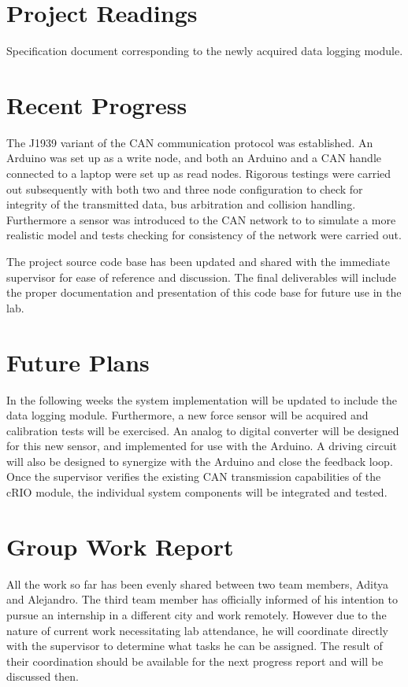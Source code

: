 \documentclass[12pt]{article}
\begin{document}
\section*{Project Readings}
Specification document corresponding to the newly acquired data logging module.

\section*{Recent Progress}
The J1939 variant of the CAN communication protocol was established. An Arduino
was set up as a write node, and both an Arduino and a CAN handle connected to a
laptop were set up as read nodes. Rigorous testings were carried out 
subsequently with both two and three node configuration to check for integrity 
of the transmitted data, bus arbitration and collision handling. Furthermore a
sensor was introduced to the CAN network to to simulate a more realistic model
and tests checking for consistency of the network were carried out.\newline

The project source code base has been updated and shared with the immediate 
supervisor for ease of reference and discussion. The final deliverables will
include the proper documentation and presentation of this code base for future
use in the lab.

\section*{Future Plans}
In the following weeks the system implementation will be updated to include 
the data logging module. Furthermore, a new force sensor will be acquired and 
calibration tests will be exercised. An analog to digital converter will be 
designed for this new sensor, and implemented for use with the Arduino.
A driving circuit will also be designed to synergize with the Arduino and close
the feedback loop. Once the supervisor verifies the existing CAN transmission 
capabilities of the cRIO module, the individual system components will be 
integrated and tested.

\section*{Group Work Report}
All the work so far has been evenly shared between two team members, Aditya and
Alejandro. The third team member has officially informed of his intention to 
pursue an internship in a different city and work remotely. However due to the 
nature of current work necessitating lab attendance, he will coordinate directly
with the supervisor to determine what tasks he can be assigned. The result of
their coordination should be available for the next progress report and will
be discussed then.
\end{document}
